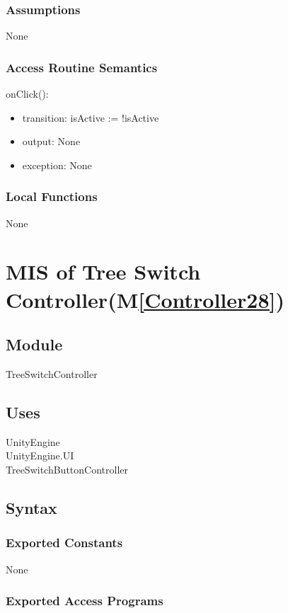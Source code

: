 \documentclass[12pt, titlepage]{article}
\newcommand{\mref}[1]{M\ref{#1}}
\begin{document}
\subsubsection{Assumptions}
None
\subsubsection{Access Routine Semantics}

\noindent onClick():
\begin{itemize}
\item transition: isActive := !isActive
\item output: None
\item exception: None
\end{itemize}


\subsubsection{Local Functions}
None

\newpage

\section{MIS of Tree Switch Controller(\mref{Controller28})}  

\subsection{Module}
TreeSwitchController


\subsection{Uses}
UnityEngine\\
UnityEngine.UI\\
TreeSwitchButtonController

\subsection{Syntax}
\subsubsection{Exported Constants}
None
\subsubsection{Exported Access Programs}
\end{document}
